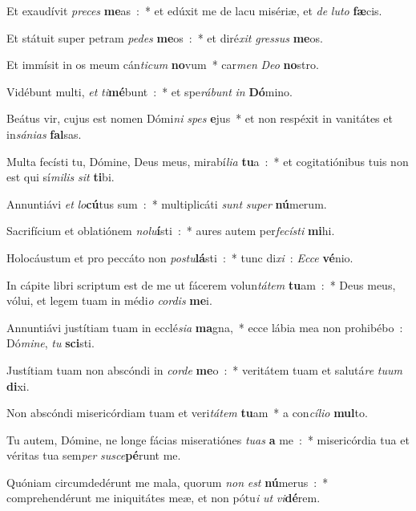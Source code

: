 ﻿\item Et exaudívit \emph{pre}\emph{ces} \textbf{me}as~:~* et edúxit me de lacu misériæ, et \emph{de} \emph{lu}\emph{to} \textbf{fæ}cis.
\item Et státuit super petram \emph{pe}\emph{des} \textbf{me}os~:~* et diré\emph{xit} \emph{gres}\emph{sus} \textbf{me}os.
\item Et immísit in os meum cán\emph{ti}\emph{cum} \textbf{no}vum~* car\emph{men} \emph{De}\emph{o} \textbf{no}stro.
\item Vidébunt multi, \emph{et} \emph{ti}\textbf{mé}bunt~:~* et spe\emph{rá}\emph{bunt} \emph{in} \textbf{Dó}mino.
\item Beátus vir, cujus est nomen Dómi\emph{ni} \emph{spes} \textbf{e}jus~* et non respéxit in vanitátes et in\emph{sá}\emph{ni}\emph{as} \textbf{fal}sas.
\item Multa fecísti tu, Dómine, Deus meus, mirabí\emph{li}\emph{a} \textbf{tu}a~:~* et cogitatiónibus tuis non est qui sí\emph{mi}\emph{lis} \emph{sit} \textbf{ti}bi.
\item Annuntiávi \emph{et} \emph{lo}\textbf{cú}tus sum~:~* multiplicáti \emph{sunt} \emph{su}\emph{per} \textbf{nú}merum.
\item Sacrifícium et oblatiónem \emph{no}\emph{lu}\textbf{í}sti~:~* aures autem per\emph{fe}\emph{cí}\emph{sti} \textbf{mi}hi.
\item Holocáustum et pro peccáto non \emph{post}\emph{u}\textbf{lá}sti~:~* tunc di\emph{xi}~: \emph{Ec}\emph{ce} \textbf{vé}nio.
\item In cápite libri scriptum est de me ut fácerem volun\emph{tá}\emph{tem} \textbf{tu}am~:~* Deus meus, vólui, et legem tuam in médi\emph{o} \emph{cor}\emph{dis} \textbf{me}i.
\item Annuntiávi justítiam tuam in ecclé\emph{si}\emph{a} \textbf{ma}gna,~* ecce lábia mea non prohibébo~: Dó\emph{mi}\emph{ne}, \emph{tu} \textbf{sci}sti.
\item Justítiam tuam non abscóndi in \emph{cor}\emph{de} \textbf{me}o~:~* veritátem tuam et salutá\emph{re} \emph{tu}\emph{um} \textbf{di}xi.
\item Non abscóndi misericórdiam tuam et veri\emph{tá}\emph{tem} \textbf{tu}am~* a con\emph{cí}\emph{li}\emph{o} \textbf{mul}to.
\item Tu autem, Dómine, ne longe fácias miseratiónes \emph{tu}\emph{as} \textbf{a} me~:~* misericórdia tua et véritas tua sem\emph{per} \emph{sus}\emph{ce}\textbf{pé}runt me.
\item Quóniam circumdedérunt me mala, quorum \emph{non} \emph{est} \textbf{nú}merus~:~* comprehendérunt me iniquitátes meæ, et non pótu\emph{i} \emph{ut} \emph{vi}\textbf{dé}rem.
